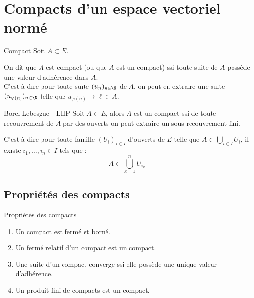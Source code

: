 \section{Compacts d'un espace vectoriel normé}

\begin{definition}{Compact}{}
    Soit $A \subset E$. 

    On dit que $A$ est compact (ou que $A$ est un compact) ssi toute suite de $A$ possède une 
    valeur d'adhérence dans $A$.\\

    C'est à dire pour toute suite $(u_n)_{n \in \N}$ de $A$, on peut en extraire une suite 
    $(u_{\varphi(n)})_{n \in \N}$ telle que $u_{\varphi(n)} \to \ell \in A$.
\end{definition}


\begin{definition}{Borel-Lebesgue - LHP}{}
    Soit $A \subset E$, alors
    $A$ est un compact ssi de toute recouvrement de $A$ par des ouverts on peut extraire un sous-recouvrement fini.

    C'est à dire pour toute famille $(U_i)_{i \in I}$ d'ouverts de $E$ 
    telle que $\displaystyle A \subset \bigcup_{i \in I} U_i$, il existe $i_1, \ldots, i_n \in I$ tels que :
    $$\displaystyle A \subset \bigcup_{k=1}^n U_{i_k}$$
\end{definition}

\subsection{Propriétés des compacts}

\begin{proposition}{Propriétés des compacts}{}
    \begin{enumerate}
        \item Un compact est fermé et borné.
        \item Un fermé relatif d'un compact est un compact.
        \item Une suite d'un compact converge ssi elle possède une unique valeur d'adhérence. 
        \item Un produit fini de compacts est un compact.
    \end{enumerate}
\end{proposition}


